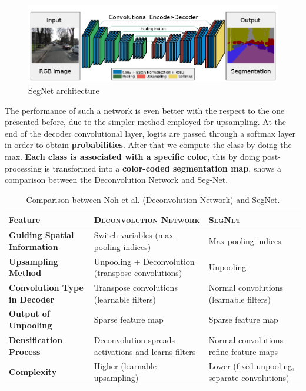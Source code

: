 \begin{figure}[h]
    \centering
    \includegraphics[scale=0.7]{img/SegNet.png}
    \caption{SegNet architecture}
\end{figure}

The performance of such a network is even better with the respect to the one presented before, due to the simpler method employed for upsampling. At the end of the decoder convolutional layer, logits are passed through a softmax layer in order to obtain \textbf{probabilities}. After that we compute the class by doing the max. \textbf{Each class is associated with a specific color}, this by doing post-processing is transformed into a \textbf{color-coded segmentation map}.  shows a comparison between the Deconvolution Network and Seg-Net.

\begin{table}
\centering
\begin{tabular}{|>{\raggedright\arraybackslash}p{4cm}|>{\raggedright\arraybackslash}p{5cm}|>{\raggedright\arraybackslash}p{5cm}|}
\hline
\textbf{Feature}                  & \textsc{Deconvolution Network}     & \textsc{SegNet}                           \\ \hline
\textbf{Guiding Spatial Information} & Switch variables (max-pooling indices)         & Max-pooling indices                        \\ \hline
\textbf{Upsampling Method}         & Unpooling + Deconvolution (transpose convolutions) & Unpooling                                  \\ \hline
\textbf{Convolution Type in Decoder} & Transpose convolutions (learnable filters)     & Normal convolutions (learnable filters)    \\ \hline
\textbf{Output of Unpooling}       & Sparse feature map                              & Sparse feature map                         \\ \hline
\textbf{Densification Process}     & Deconvolution spreads activations and learns filters & Normal convolutions refine feature maps    \\ \hline
\textbf{Complexity}                & Higher (learnable upsampling)                   & Lower (fixed unpooling, separate convolutions) \\ \hline
\end{tabular}
\caption{Comparison between Noh et al. (Deconvolution Network) and SegNet.}
\label{tab:segVSnoh}
\end{table}

